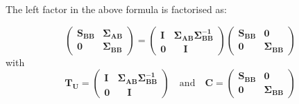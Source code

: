 \documentclass[openany]{book}
\begin{document}
The left factor in the above formula is factorised as:

$$
 \left( \begin{array}{ll} \mathbf{S_{BB}}  & \mathbf{\Sigma_{AB}}
	\\ \mathbf{0} & \mathbf{\Sigma_{BB}}  \end{array}
\right) 
 =  \left( \begin{array}{ll} 
	\mathbf{I} &  \mathbf{\Sigma_{AB}} \mathbf{\Sigma_{BB}^{-1}}
	\\ \mathbf{0} & \quad \mathbf{I} \quad
\end{array}
\right)
\left( \begin{array}{ll} 
	\mathbf{S_{BB}}   & \mathbf{0}\\ 
	\mathbf{0}  & \mathbf{\Sigma_{BB}}
\end{array} \right)
$$
with
$$ \mathbf{T_U} =
\left( \begin{array}{ll} 
	\mathbf{I} &  \mathbf{\Sigma_{AB}} \mathbf{\Sigma_{BB}^{-1}}
	\\ \mathbf{0} & \quad \mathbf{I} \quad
\end{array}
\right)  \quad \text{and} \quad \mathbf{C} =
\left( \begin{array}{ll} 
	\mathbf{S_{BB}}   & \mathbf{0}\\ 
	\mathbf{0}  & \mathbf{\Sigma_{BB}}
\end{array} \right) 
$$
\end{document}
